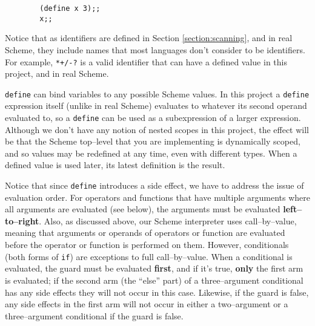 \documentclass[11pt]{article}
\begin{document}
      \vspace{-1mm}

      \begin{center}

        \begin{BVerbatim}
        (define x 3);;
        x;;
        \end{BVerbatim}

      \end{center}

      \vspace{-2mm}

      Notice that as identifiers are defined in Section
    \ref{section:scanning}, and in real Scheme, they include names that most
    languages don't consider to be identifiers.  For example, \texttt{*+/-?}
    is a valid identifier that can have a defined value in this project, and
    in real Scheme.

      \texttt{define} can bind variables to any possible Scheme values.  In
    this project a \texttt{define} expression itself (unlike in real Scheme)
    evaluates to whatever its second operand evaluated to, so a
    \texttt{define} can be used as a subexpression of a larger expression.
    Although we don't have any notion of nested scopes in this project, the
    effect will be that the Scheme top--level that you are implementing is
    dynamically scoped, and so values may be redefined at any time, even
    with different types.  When a defined value is used later, its latest
    definition is the result.

      Notice that since \texttt{define} introduces a side effect, we have to
    address the issue of evaluation order.  For operators and functions that
    have multiple arguments where all arguments are evaluated (see below),
    the arguments must be evaluated \textbf{left--to--right}.  Also, as
    discussed above, our Scheme interpreter uses call--by--value, meaning
    that arguments or operands of operators or function are evaluated before
    the operator or function is performed on them.  However, conditionals
    (both forms of \texttt{if}) are exceptions to full call--by--value.
    When a conditional is evaluated, the guard must be evaluated
    \textbf{first}, and if it's true, \textbf{only} the first arm is
    evaluated; if the second arm (the ``else'' part) of a three--argument
    conditional has any side effects they will not occur in this case.
    Likewise, if the guard is false, any side effects in the first arm will
    not occur in either a two--argument or a three--argument conditional if
    the guard is false.
\end{document}
